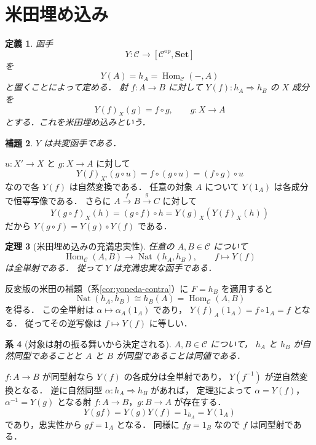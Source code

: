 \documentclass[a5paper,10pt,onecolumn]{jsarticle}
\makeatletter
\theoremstyle{mathnotetheorem}
\newtheorem{theorem}{定理}[section]
\newtheorem{definition}[theorem]{定義}
\newtheorem{lemma}[theorem]{補題}
\newtheorem{corollary}[theorem]{系}
\renewcommand{\proofname}{証明}
\renewenvironment{proof}[1][\proofname]{%
  \par\pushQED{\qed}\normalfont\topsep4\p@\@plus2\p@\relax
  \trivlist\item[\hskip\labelsep\bfseries #1]\ignorespaces
}{\popQED\endtrivlist\@endpefalse}
\makeatother
\begin{document}
\section{米田埋め込み}

\begin{definition}
函手
\[
 Y:\mathcal C\longrightarrow
 [\mathcal C^{\mathrm{op}},\mathbf{Set}]
\]
を
\[
 Y(A)=h_A=\operatorname{Hom}_{\mathcal C}(-,A)
\]
と置くことによって定める．
射 $f:A\to B$ に対して
$Y(f):h_A\Rightarrow h_B$ の $X$ 成分を
\[
 Y(f)_X(g)=f\circ g,\qquad g:X\to A
\]
とする．これを\emph{米田埋め込み}という．
\end{definition}

\begin{lemma}\label{lem:yoneda-functor}
$Y$ は共変函手である．
\end{lemma}
\begin{proof}
$u:X'\to X$ と $g:X\to A$ に対して
\[
 Y(f)_{X'}(g\circ u)
 =f\circ(g\circ u)
 =(f\circ g)\circ u
\]
なので各 $Y(f)$ は自然変換である．
任意の対象 $A$ について
$Y(1_A)$ は各成分で恒等写像である．
さらに $A\xrightarrow{f}B\xrightarrow{g}C$ に対して
\[
 Y(g\circ f)_X(h)=(g\circ f)\circ h
 =Y(g)_X(Y(f)_X(h))
\]
だから $Y(g\circ f)=Y(g)\circ Y(f)$ である．
\end{proof}

\begin{theorem}[米田埋め込みの充満忠実性]\label{thm:fully-faithful}
任意の $A,B\in\mathcal C$ について
\[
 \operatorname{Hom}_{\mathcal C}(A,B)
 \longrightarrow\operatorname{Nat}(h_A,h_B),
 \qquad f\longmapsto Y(f)
\]
は全単射である．
従って $Y$ は充満忠実な函手である．
\end{theorem}
\begin{proof}
反変版の米田の補題（系\ref{cor:yoneda-contra}）に
$F=h_B$ を適用すると
\[
 \operatorname{Nat}(h_A,h_B)
 \cong h_B(A)
 =\operatorname{Hom}_{\mathcal C}(A,B)
\]
を得る．
この全単射は $\alpha\mapsto\alpha_A(1_A)$ であり，
$Y(f)_A(1_A)=f\circ1_A=f$ となる．
従ってその逆写像は $f\mapsto Y(f)$ に等しい．
\end{proof}

\begin{corollary}[対象は射の振る舞いから決定される]
\label{cor:objects}
$A,B\in\mathcal C$ について，
$h_A$ と $h_B$ が自然同型であることと
$A$ と $B$ が同型であることは同値である．
\end{corollary}
\begin{proof}
$f:A\to B$ が同型射なら
$Y(f)$ の各成分は全単射であり，
$Y(f^{-1})$ が逆自然変換となる．
逆に自然同型 $\alpha:h_A\Rightarrow h_B$ があれば，
定理\ref{thm:fully-faithful}によって
$\alpha=Y(f)$，$\alpha^{-1}=Y(g)$
となる射 $f:A\to B$，$g:B\to A$ が存在する．
\[
 Y(gf)=Y(g)Y(f)=1_{h_A}=Y(1_A)
\]
であり，忠実性から $gf=1_A$ となる．
同様に $fg=1_B$ なので $f$ は同型射である．
\end{proof}
\end{document}
